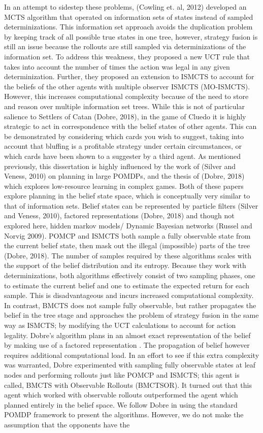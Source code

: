 \documentclass[msc, deptreport, ai, romanprepages]{infthesis}
\begin{document}
In an attempt to sidestep these problems, (Cowling et. al, 2012) developed an MCTS algorithm that operated on information sets of states instead of sampled determinizations. This information set approach avoids the duplication problem by keeping track of all possible true states in one tree, however, strategy fusion is still an issue because the rollouts are still sampled via determinizations of the information set. To address this weakness, they proposed a new UCT rule that takes into account the number of times the action was legal in any given determinization. Further, they proposed an extension to ISMCTS to account for the beliefs of the other agents with multiple observer ISMCTS (MO-ISMCTS). However, this increases computational complexity because of the need to store and reason over multiple information set trees. While this is not of particular salience to Settlers of Catan (Dobre, 2018), in the game of Cluedo it is highly strategic to act in correspondence with the belief states of other agents. This can be demonstrated by considering which cards you wish to suggest, taking into account that bluffing is a profitable strategy under certain circumstances, or which cards have been shown to a suggester by a third agent. As mentioned previously, this dissertation is highly influenced by the work of (Silver and Veness, 2010) on planning in large POMDPs, and the thesis of (Dobre, 2018) which explores low-resource learning in complex games. Both of these papers explore planning in the belief state space, which is conceptually very similar to that of information sets. Belief states can be represented by particle filters (Silver and Veness, 2010), factored representations (Dobre, 2018) and though not explored here, hidden markov models/ Dynamic Bayesian networks (Russel and Norvig 2009). POMCP and ISMCTS both sample a fully observable state from the current belief state, then mask out the illegal (impossible) parts of the tree (Dobre, 2018). The number of samples required by these algorithms scales with the support of the belief distribution and its entropy. Because they work with determinizations, both algorithms effectively consist of two sampling phases, one to estimate the current belief and one to estimate the expected return for each sample. This is disadvantageous and incurs increased computational complexity. In contrast, BMCTS does not sample fully observable, but rather propagates the belief in the tree stage and approaches the problem of strategy fusion in the same way as ISMCTS; by modifying the UCT calculations to account for action legality. Dobre’s algorithm plans in an almost exact representation of the belief by making use of a factored representation \cite{Mihai}. The propagation of belief however requires additional computational load. In an effort to see if this extra complexity was warranted, Dobre experimented with sampling fully observable states at leaf nodes and performing rollouts just like POMCP and ISMCTS; this agent is called, BMCTS with Observable Rollouts (BMCTSOR). It turned out that this agent which worked with observable rollouts outperformed the agent which planned entirely in the belief space. We follow Dobre in using the standard POMDP framework to present the algorithms. However, we do not make the assumption that the opponents have the 
\end{document}
